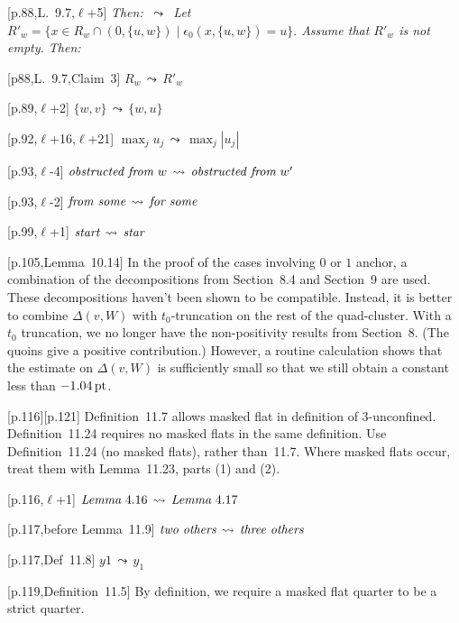 \documentclass[11pt]{amsart}
\def\op#1{{\text{#1}}}
\def\lto{\ensuremath{\,\leadsto\,}}
\def\line{$\ell$}
\def\text{\hbox}
\def\sz{small} %
\def\rmx{\rm}
\begin{document}
\begin{\sz}
	
[p.88,L.~9.7,\line+5]
         {\it Then: $\lto$ Let
          $
          R'_w = \{x\in R_w \cap(0,\{u,w\})\mid 
          \epsilon_0(x,\{u,w\}) = u\}.
          $
          Assume that $R'_w$ is not empty. Then:}

[p88,L.~9.7,Claim~3]
        $R_w \lto R'_w$

[p.89,\line+2]
	$
	\{w,v\}\lto\{w,u\}
	$

[p.92,\line+16,\line+21]
   $     \max_j u_j \lto \max_j |u_j|$
	
[p.93,\line-4]
	$
	\text{{\it obstructed from} }w \lto
	\text{{\it obstructed from} }w'
	$
		
[p.93,\line-2]
	$
	\text{{\it from some}} \lto \text{{\it for some}}
	$

[p.99,\line+1]
        $
        \text{{\it start}} \lto \text{{\it star}}
        $

[p.105,Lemma~10.14]  {\rmx In the proof of the cases involving
   $0$ or $1$ anchor, a combination of the decompositions from
   Section~8.4 and Section~9 are used.  These decompositions haven't
   been shown to be compatible.  
   Instead, it is better to combine
   $\Delta(v,W)$ with $t_0$-truncation on the rest of the quad-cluster.
   With a $t_0$ truncation, we no longer have the non-positivity results
   from Section~8.  (The quoins give a positive contribution.) 
   However, a routine calculation shows that
   the estimate on $\Delta(v,W)$ is sufficiently small so that we still
   obtain a constant less than $-1.04\,\op{pt}$.}
   

[p.116][p.121] {\rmx Definition~11.7 allows masked
flat in definition of $3$-unconfined.
Definition~11.24 requires no masked flats
in the same definition.  Use Definition~11.24 (no masked flats), rather than~11.7.  
Where masked flats occur,
treat them with Lemma~11.23, parts (1) and (2).}

[p.116,\line+1] 
	$
	\text{{\it Lemma}}~4.16 \lto \text{{\it Lemma}}~4.17
	$

[p.117,before Lemma~11.9]
	$
	\text{\it two others} \lto \text{\it three others}
	$
	
[p.117,Def~11.8]
    $
    y1 \lto y_1
    $
    
 
[p.119,Definition~11.5]  {\rmx By definition, we require a masked flat quarter to
be a strict quarter.}
	

\end{\sz}
\end{document}

